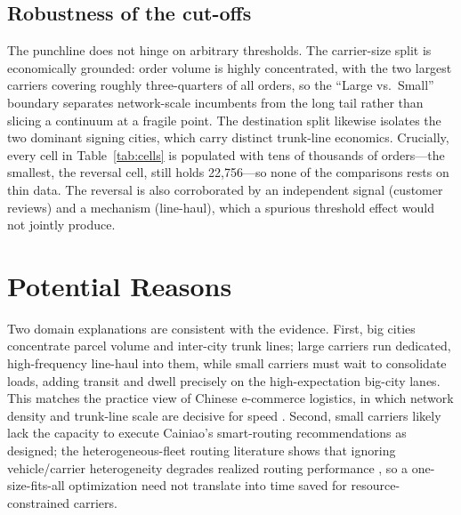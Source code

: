 \documentclass[11pt]{article}
\begin{document}
\subsection{Robustness of the cut-offs}
The punchline does not hinge on arbitrary thresholds. The carrier-size split is
economically grounded: order volume is highly concentrated, with the two largest
carriers covering roughly three-quarters of all orders, so the
``Large vs.\ Small'' boundary separates network-scale incumbents from the long
tail rather than slicing a continuum at a fragile point. The destination split
likewise isolates the two dominant signing cities, which carry distinct
trunk-line economics. Crucially, every cell in Table~\ref{tab:cells} is populated
with tens of thousands of orders---the smallest, the reversal cell, still holds
22{,}756---so none of the comparisons rests on thin data. The reversal is also
corroborated by an independent signal (customer reviews) and a mechanism
(line-haul), which a spurious threshold effect would not jointly produce.

\section{Potential Reasons}
Two domain explanations are consistent with the evidence. First, big cities
concentrate parcel volume and inter-city trunk lines; large carriers run
dedicated, high-frequency line-haul into them, while small carriers must wait to
consolidate loads, adding transit and dwell precisely on the high-expectation
big-city lanes. This matches the practice view of Chinese e-commerce logistics, in
which network density and trunk-line scale are decisive for speed
\citep{yu2016}. Second, small carriers likely lack the capacity to execute
Cainiao's smart-routing recommendations as designed; the heterogeneous-fleet
routing literature shows that ignoring vehicle/carrier heterogeneity degrades
realized routing performance \citep{koc2016}, so a one-size-fits-all optimization
need not translate into time saved for resource-constrained carriers.

\end{document}
